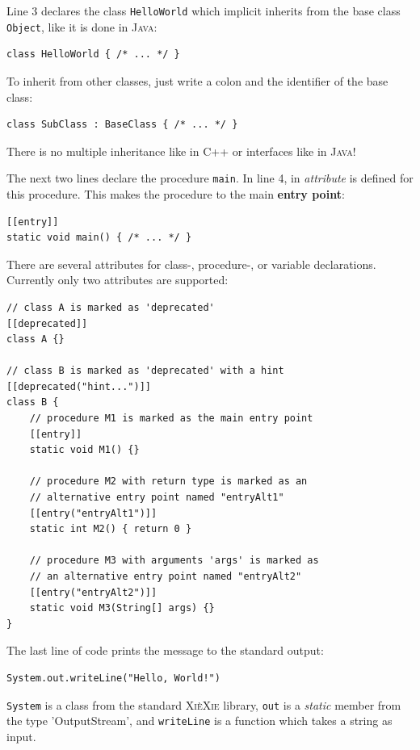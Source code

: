 \documentclass{report}
\def\xiexie{\textsc{Xi\`eXie}\xspace}
\def\cpp{\textsc{C++}\xspace}
\def\java{\textsc{Java}\xspace}
\begin{document}
Line 3 declares the class \texttt{HelloWorld} which implicit inherits from the base class \texttt{Object},
like it is done in \java:
\begin{lstlisting}
class HelloWorld { /* ... */ }
\end{lstlisting}
To inherit from other classes, just write a colon and the identifier of the base class:
\begin{lstlisting}
class SubClass : BaseClass { /* ... */ }
\end{lstlisting}
There is no multiple inheritance like in \cpp or interfaces like in \java!

The next two lines declare the procedure \texttt{main}. In line 4, in \textit{attribute} is defined
for this procedure. This makes the procedure to the main \textbf{entry point}:
\begin{lstlisting}
[[entry]]
static void main() { /* ... */ }
\end{lstlisting}
There are several attributes for class-, procedure-, or variable declarations. Currently only two attributes are supported:
\begin{lstlisting}
// class A is marked as 'deprecated'
[[deprecated]]
class A {}

// class B is marked as 'deprecated' with a hint
[[deprecated("hint...")]]
class B {
    // procedure M1 is marked as the main entry point
    [[entry]]
    static void M1() {}
    
    // procedure M2 with return type is marked as an
    // alternative entry point named "entryAlt1"
    [[entry("entryAlt1")]]
    static int M2() { return 0 }
    
    // procedure M3 with arguments 'args' is marked as
    // an alternative entry point named "entryAlt2"
    [[entry("entryAlt2")]]
    static void M3(String[] args) {}
}
\end{lstlisting}

The last line of code prints the message to the standard output:
\begin{lstlisting}
System.out.writeLine("Hello, World!")
\end{lstlisting}
\texttt{System} is a class from the standard \xiexie library, \texttt{out} is a \textit{static} member
from the type 'OutputStream', and \texttt{writeLine} is a function which takes a string as input.


\end{document}

